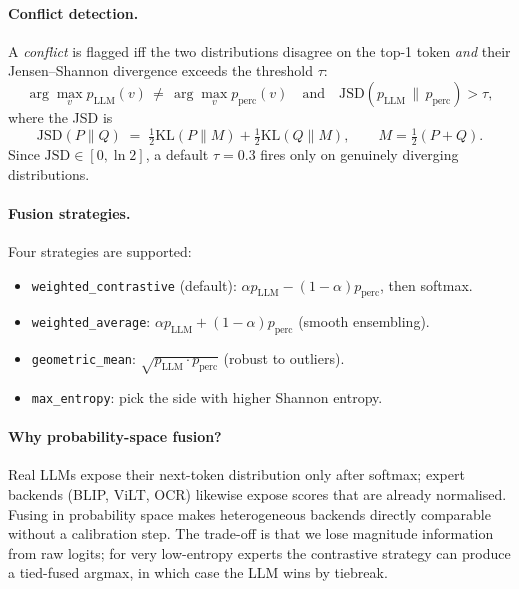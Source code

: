 \documentclass[11pt,a4paper]{article}
\newcommand{\pLLM}{p_{\mathrm{LLM}}}
\newcommand{\pperc}{p_{\mathrm{perc}}}
\newcommand{\KL}{\mathrm{KL}}
\newcommand{\JSD}{\mathrm{JSD}}
\begin{document}
\paragraph{Conflict detection.}
A \emph{conflict} is flagged iff the two distributions disagree on the
top-1 token \emph{and} their Jensen--Shannon divergence exceeds the
threshold $\tau$:
\begin{equation}\label{eq:conflict}
\arg\max_v \pLLM(v) \,\neq\, \arg\max_v \pperc(v)
\quad \text{and} \quad
\JSD(\pLLM \,\|\, \pperc) > \tau,
\end{equation}
where the JSD is
\begin{equation}\label{eq:jsd}
\JSD(P \| Q) \;=\; \tfrac{1}{2} \KL(P \| M) + \tfrac{1}{2} \KL(Q \| M),
\qquad M = \tfrac{1}{2}(P + Q).
\end{equation}
Since $\JSD \in [0, \ln 2]$, a default $\tau = 0.3$ fires only on
genuinely diverging distributions.

\paragraph{Fusion strategies.}
Four strategies are supported:
\begin{itemize}[leftmargin=*]
  \item \texttt{weighted\_contrastive} (default):
        $\alpha \pLLM - (1-\alpha) \pperc$, then softmax.
  \item \texttt{weighted\_average}:
        $\alpha \pLLM + (1-\alpha) \pperc$ (smooth ensembling).
  \item \texttt{geometric\_mean}:
        $\sqrt{\pLLM \cdot \pperc}$ (robust to outliers).
  \item \texttt{max\_entropy}: pick the side with higher Shannon entropy.
\end{itemize}

\paragraph{Why probability-space fusion?}
Real LLMs expose their next-token distribution only after softmax; expert
backends (BLIP, ViLT, OCR) likewise expose scores that are already
normalised. Fusing in probability space makes heterogeneous backends
directly comparable without a calibration step. The trade-off is that we
lose magnitude information from raw logits; for very low-entropy experts
the contrastive strategy can produce a tied-fused argmax, in which case
the LLM wins by tiebreak.

\end{document}
